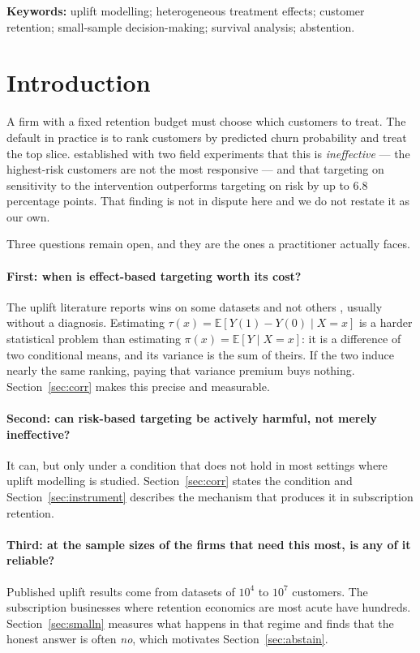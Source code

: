 \documentclass[11pt,a4paper]{article}
\newcommand{\CATE}{\tau}
\begin{document}
\medskip
\noindent\textbf{Keywords:} uplift modelling; heterogeneous treatment effects;
customer retention; small-sample decision-making; survival analysis; abstention.

\section{Introduction}
\label{sec:intro}

A firm with a fixed retention budget must choose which customers to treat. The
default in practice is to rank customers by predicted churn probability and treat
the top slice. \citet{ascarza2018} established with two field experiments that this
is \emph{ineffective} --- the highest-risk customers are not the most responsive ---
and that targeting on sensitivity to the intervention outperforms targeting on risk
by up to 6.8 percentage points. That finding is not in dispute here and we do not
restate it as our own.

Three questions remain open, and they are the ones a practitioner actually faces.

\paragraph{First: when is effect-based targeting worth its cost?} The uplift
literature reports wins on some datasets and not others
\citep{gutierrez2017,devriendt2018}, usually without a diagnosis. Estimating
$\CATE(x) = \mathbb{E}[Y(1)-Y(0) \mid X=x]$ is a harder statistical problem than
estimating $\pi(x) = \mathbb{E}[Y \mid X=x]$: it is a difference of two conditional
means, and its variance is the sum of theirs. If the two induce nearly the same
ranking, paying that variance premium buys nothing. Section~\ref{sec:corr} makes
this precise and measurable.

\paragraph{Second: can risk-based targeting be actively harmful, not merely
ineffective?} It can, but only under a condition that does not hold in most settings
where uplift modelling is studied. Section~\ref{sec:corr} states the condition and
Section~\ref{sec:instrument} describes the mechanism that produces it in
subscription retention.

\paragraph{Third: at the sample sizes of the firms that need this most, is any of it
reliable?} Published uplift results come from datasets of $10^4$ to $10^7$ customers.
The subscription businesses where retention economics are most acute have hundreds.
Section~\ref{sec:smalln} measures what happens in that regime and finds that the
honest answer is often \emph{no}, which motivates Section~\ref{sec:abstain}.
\end{document}
